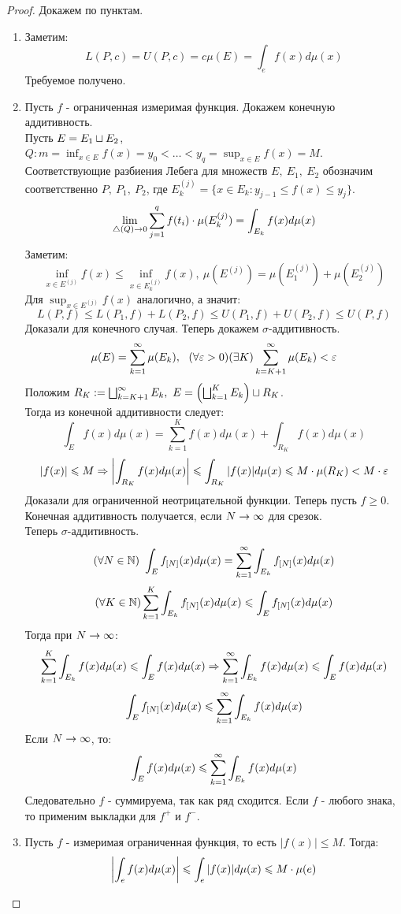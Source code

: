 \begin{proof}
	Докажем по пунктам.
	\begin{enumerate}
		\item Заметим:
		\[L(P,c)=U(P,c)=c\mu(E)=\int_ef(x)d\mu(x)\]
		Требуемое получено.
		\item Пусть $f$ - ограниченная измеримая функция. Докажем конечную аддитивность.\\
		Пусть $E=E_1\sc E_2$, $Q:m=\inf_{x\in E}f(x)=y_0<\dots<y_q=\sup_{x\in E}f(x)=M$.\\
		Соответствующие разбиения Лебега для множеств $E,\ E_1,\ E_2$ обозначим соответственно $P,\ P_1,\ P_2$, где $E_k^{(j)}=\{x\in E_k:y_{j-1}\le f(x)\le y_j\}$.
		\[\lim_{\tr(Q)\ra0}\sum_{j=1}^qf(t_i)\cdot\mu(E_k^{(j)})=\int_{E_k}f(x)d\mu(x)\]
		Заметим:
		\[\inf_{x\in E^{(j)}}f(x)\le\inf_{x\in E_k^{(j)}}f(x),\ \mu(E^{(j)})=\mu(E_1^{(j)})+\mu(E_2^{(j)})\]
		Для $\sup_{x\in E^{(j)}}f(x)$ аналогично, а значит:
		\[L(P,f)\le L(P_1,f)+L(P_2,f)\le U(P_1,f)+U(P_2,f)\le U(P,f)\]
		Доказали для конечного случая. Теперь докажем $\sigma$-аддитивность.
		\[\mu(E)=\sum_{k=1}^\i\mu(E_k),\ \ (\fa\eps>0)(\ex K) \sum_{k=K+1}^\i\mu(E_k)<\eps\]
		Положим $R_K:=\bsc_{k=K+1}^\i E_k,\ E=\l(\bsc_{k=1}^KE_k\r)\sc R_K$.\\ 
		Тогда из конечной аддитивности следует:
		\[\int_Ef(x)d\mu(x)=\sum_{k=1}^Kf(x)d\mu(x)+\int_{R_K}f(x)d\mu(x)\]
		\[|f(x)|\le M\Ra\l|\int_{R_K}f(x)d\mu(x)\r|\le\int_{R_K}|f(x)|d\mu(x)\le M\cdot\mu(R_K)<M\cdot\eps\]
		Доказали для ограниченной неотрицательной функции. Теперь пусть $f\ge0$.\\
		Конечная аддитивность получается, если $N\ra\i$ для срезок.\\
		Теперь $\sigma$-аддитивность.
		\begin{equation*}
			(\fa N\in\N)\ \int_E\sr(x)d\mu(x)=\sum_{k=1}^\i\int_{E_k}\sr(x)d\mu(x)
		\end{equation*}
		\[(\fa K\in\N)\sum_{k=1}^K\int_{E_k}\sr(x)d\mu(x)\le\int_E\sr(x)d\mu(x)\]
		Тогда при $N\ra\i$:
		\[\sum_{k=1}^K\int_{E_k}f(x)d\mu(x)\le\int_Ef(x)d\mu(x)\Ra\sum_{k=1}^\i\int_{E_k}f(x)d\mu(x)\le\int_Ef(x)d\mu(x)\]
		\[\int_E\sr(x)d\mu(x)\le\sum_{k=1}^\i\int_{E_k}f(x)d\mu(x)\]
		Если $N\ra\i$, то:
		\[\int_Ef(x)d\mu(x)\le\sum_{k=1}^\i\int_{E_k}f(x)d\mu(x)\]
		Следовательно $f$ - суммируема, так как ряд сходится. Если $f$ - любого знака, то применим выкладки для $f^+$ и $f^-$.
		\item Пусть $f$ - измеримая ограниченная функция, то есть $|f(x)|\le M$. Тогда:
		\[\l|\int_ef(x)d\mu(x)\r|\le\int_e|f(x)|d\mu(x)\le M\cdot\mu(e)\]

\end{enumerate}
\end{proof}
